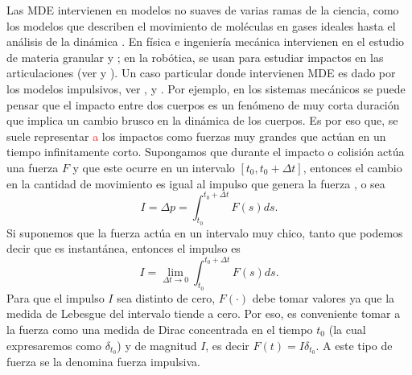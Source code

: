  Las MDE intervienen en modelos no suaves de varias ramas de la ciencia, como los modelos que describen el movimiento de moléculas en gases ideales hasta el análisis de la dinámica . En  física e ingeniería mecánica intervienen en el estudio de materia granular y \reversemarginpar{}; en la robótica, se usan para estudiar impactos en las articulaciones (ver \cite{Brogliato} y \cite{ALeonov}). Un caso particular donde intervienen MDE es  dado por los modelos impulsivos, ver \cite{Bainov},\cite{Bainov_2} y \cite{Lakshmikan}. Por ejemplo, en los sistemas mecánicos se puede pensar que el impacto entre dos cuerpos es un fenómeno de muy corta duración que implica un cambio brusco en la dinámica de los cuerpos. Es por eso que,\normalmarginpar{} se suele representar \textcolor{red} {a} los impactos como fuerzas muy grandes que actúan en un tiempo infinitamente corto. Supongamos que durante el impacto o colisión actúa una fuerza $F$ y que este ocurre en un intervalo $[t_0,t_0+\Delta t]$, entonces el cambio en la cantidad de movimiento es igual al impulso que genera la fuerza  \cite{Serway}, o sea
$$I=\Delta p=\int_{t_0}^{t_0+\Delta t}F(s)ds.$$
Si suponemos que la fuerza actúa en un intervalo muy chico, tanto que podemos decir que es instantánea, entonces el impulso es
    \begin{equation*}
        I=\lim_{\Delta t \to 0}\int_{t_0}^{t_0+\Delta t}F(s) ds. 
    \end{equation*}
    \newpage
Para que el impulso $I$ sea distinto de cero, $F(\cdot)$ debe tomar valores  ya que la medida de Lebesgue del intervalo tiende a cero. Por eso, es conveniente tomar a la fuerza como una medida de Dirac concentrada en el tiempo $t_0$ (la cual expresaremos como $\delta_{t_0}$) y de magnitud $I$, es decir $F(t)=I\delta_{t_0}$. A este tipo de fuerza se la  denomina fuerza impulsiva.

